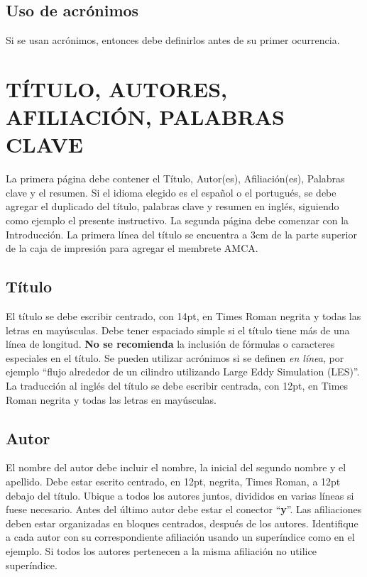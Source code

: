 \documentclass[oneside,a4paper,spanish,links]{amca}
\begin{document}
\subsection{Uso de acrónimos}

Si se usan acrónimos, entonces debe definirlos antes de su primer ocurrencia.

\section{TÍTULO, AUTORES, AFILIACIÓN, PALABRAS CLAVE}

La primera página debe contener el Título, Autor(es),
Afiliación(es), Palabras clave y el resumen. Si el idioma elegido
es el español o el portugués, se debe agregar el duplicado del
título, palabras clave y resumen en inglés, siguiendo como ejemplo
el presente instructivo. La segunda página debe comenzar con la
Introducción. La primera línea del título se encuentra a 3cm de la
parte superior de la caja de impresión para agregar el membrete
AMCA.

\subsection{Título}

El título se debe escribir centrado, con 14pt, en Times Roman
negrita y todas las letras en mayúsculas. Debe tener espaciado
simple si el título tiene más de una línea de longitud. \textbf{No
se recomienda} la inclusión de fórmulas o caracteres especiales en
el título. Se pueden utilizar acrónimos si se definen \emph{en
línea}, por ejemplo ``flujo alrededor de un cilindro utilizando
Large Eddy Simulation (LES)''. La traducción al inglés del título
se debe escribir centrada, con 12pt, en Times Roman negrita y
todas las letras en mayúsculas.

\subsection{Autor}

El nombre del autor debe incluir el nombre, la inicial del segundo
nombre y el apellido. Debe estar escrito centrado, en 12pt,
negrita, Times Roman, a 12pt debajo del título. Ubique a todos los
autores juntos, divididos en varias líneas si fuese necesario.
Antes del último autor debe estar el conector ``{\bf y}''. Las
afiliaciones deben estar organizadas en bloques centrados, después
de los autores. Identifique a cada autor con su correspondiente
afiliación usando un superíndice como en el ejemplo. Si todos los
autores pertenecen a la misma afiliación no utilice superíndice.
\end{document}
